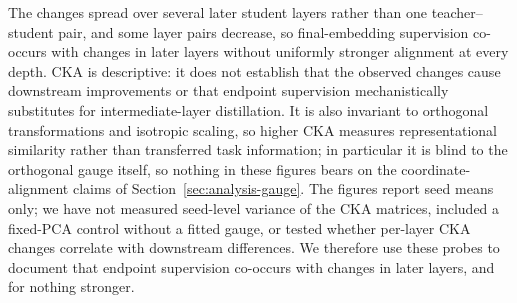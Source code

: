 The changes spread over several later student layers rather than one
teacher--student pair, and some layer pairs decrease, so final-embedding
supervision co-occurs with changes in later layers without uniformly stronger
alignment at every depth. CKA is descriptive: it does not establish that the observed
changes cause downstream improvements or that endpoint supervision
mechanistically substitutes for intermediate-layer distillation. It is also
invariant to orthogonal transformations and isotropic scaling, so higher CKA
measures representational similarity rather than transferred task
information; in particular it is blind to the orthogonal gauge itself, so
nothing in these figures bears on the coordinate-alignment claims of
Section~\ref{sec:analysis-gauge}. The figures report seed means only; we have not measured
seed-level variance of the CKA matrices, included a fixed-PCA control without
a fitted gauge, or tested whether per-layer CKA changes correlate with
downstream differences. We therefore use these probes to document that
endpoint supervision co-occurs with changes in later layers, and for nothing
stronger.
